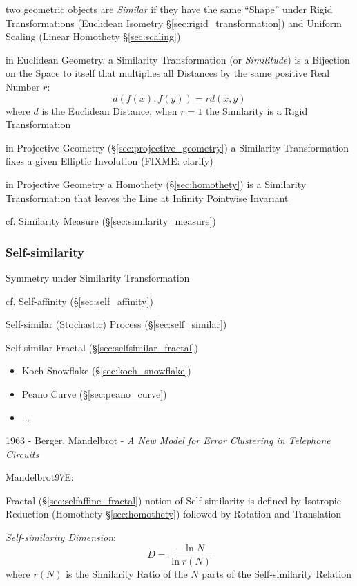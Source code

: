two geometric objects are \emph{Similar} if they have the same ``Shape'' under
Rigid Transformations (Euclidean Isometry \S\ref{sec:rigid_transformation}) and
Uniform Scaling (Linear Homothety \S\ref{sec:scaling})

in Euclidean Geometry, a Similarity Transformation (or \emph{Similitude}) is a
Bijection on the Space to itself that multiplies all Distances by the same
positive Real Number $r$:
\[
  d(f(x), f(y)) = r d(x, y)
\]
where $d$ is the Euclidean Distance; when $r = 1$ the Similarity is a
Rigid Transformation

in Projective Geometry (\S\ref{sec:projective_geometry}) a Similarity
Transformation fixes a given Elliptic Involution (FIXME: clarify)

in Projective Geometry a Homothety (\S\ref{sec:homothety}) is a Similarity
Transformation that leaves the Line at Infinity Pointwise Invariant

\fist cf. Similarity Measure (\S\ref{sec:similarity_measure})



\subsubsection{Self-similarity}\label{sec:self_similarity}

Symmetry under Similarity Transformation

cf. Self-affinity (\S\ref{sec:self_affinity})

\fist Self-similar (Stochastic) Process (\S\ref{sec:self_similar})

Self-similar Fractal (\S\ref{sec:selfsimilar_fractal})

\begin{itemize}
  \item Koch Snowflake (\S\ref{sec:koch_snowflake})
  \item Peano Curve (\S\ref{sec:peano_curve})
  \item ...
\end{itemize}

1963 - Berger, Mandelbrot -
\emph{A New Model for Error Clustering in Telephone Circuits}

Mandelbrot97E:

Fractal (\S\ref{sec:selfaffine_fractal}) notion of Self-similarity is defined by
Isotropic Reduction (Homothety \S\ref{sec:homothety}) followed by Rotation and
Translation

\emph{Self-similarity Dimension}:
\[
  D = \frac{-\ln N}{\ln r(N)}
\]
where $r(N)$ is the Similarity Ratio of the $N$ parts of the Self-similarity
Relation

